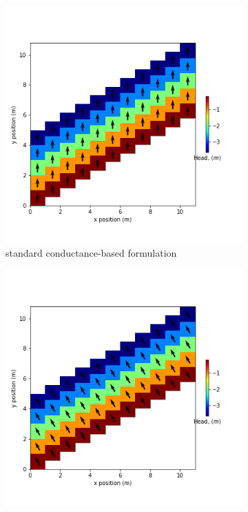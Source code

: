 \documentclass{article}
\begin{document}
\begin{figure}[H]
\centering
\begin{subfigure}{0.4\textwidth}
	\includegraphics[width=\textwidth]{../figures/disu-cf-vo-s-head.png}
	\caption{standard conductance-based formulation}
	\label{fig:disu-s-nocc-cf-head.}
\end{subfigure}
\hfill
\begin{subfigure}{0.4\textwidth}
	\includegraphics[width=\textwidth]{../figures/disu-cf-vo-x-head.png}

\end{subfigure}
\end{figure}
\end{document}
